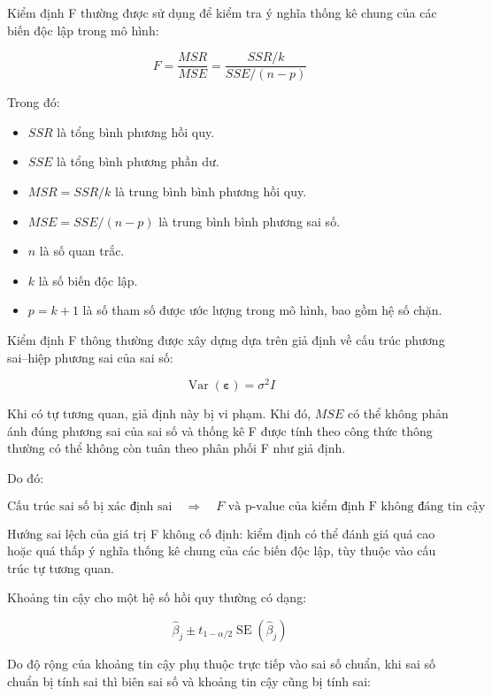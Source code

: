\documentclass[12pt,a4paper]{article}
\begin{document}
Kiểm định F thường được sử dụng để kiểm tra ý nghĩa thống kê chung của các biến độc lập trong mô hình:

\[
F
=
\frac{MSR}{MSE}
=
\frac{SSR/k}{SSE/(n-p)}
\]

Trong đó:

\begin{itemize}
    \item $SSR$ là tổng bình phương hồi quy.
    
    \item $SSE$ là tổng bình phương phần dư.
    
    \item $MSR=SSR/k$ là trung bình bình phương hồi quy.
    
    \item $MSE=SSE/(n-p)$ là trung bình bình phương sai số.
    
    \item $n$ là số quan trắc.
    
    \item $k$ là số biến độc lập.
    
    \item $p=k+1$ là số tham số được ước lượng trong mô hình, bao gồm hệ số chặn.
\end{itemize}

Kiểm định F thông thường được xây dựng dựa trên giả định về cấu trúc phương sai--hiệp phương sai của sai số:

\[
\operatorname{Var}(\boldsymbol{\varepsilon})
=
\sigma^2 I
\]

Khi có tự tương quan, giả định này bị vi phạm. Khi đó, $MSE$ có thể không phản ánh đúng phương sai của sai số và thống kê F được tính theo công thức thông thường có thể không còn tuân theo phân phối F như giả định.

Do đó:

\[
\text{Cấu trúc sai số bị xác định sai}
\quad \Rightarrow \quad
F\text{ và p-value của kiểm định F không đáng tin cậy}
\]

Hướng sai lệch của giá trị F không cố định: kiểm định có thể đánh giá quá cao hoặc quá thấp ý nghĩa thống kê chung của các biến độc lập, tùy thuộc vào cấu trúc tự tương quan.

Khoảng tin cậy cho một hệ số hồi quy thường có dạng:

\[
\hat{\beta}_j
\pm
t_{1-\alpha/2}
\operatorname{SE}(\hat{\beta}_j)
\]

Do độ rộng của khoảng tin cậy phụ thuộc trực tiếp vào sai số chuẩn, khi sai số chuẩn bị tính sai thì biên sai số và khoảng tin cậy cũng bị tính sai:
\end{document}
